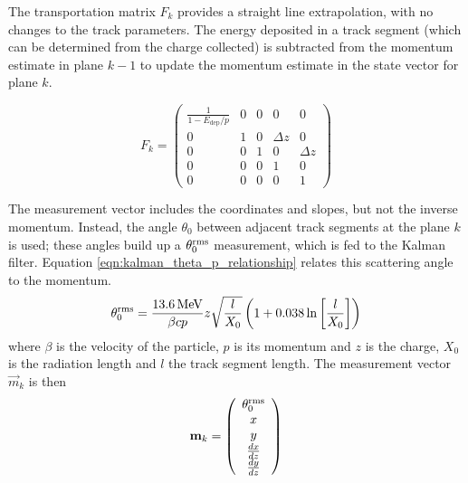 The transportation matrix $F_k$ provides a straight line extrapolation, with no changes to the track parameters. The energy deposited in a track segment (which can be determined from the charge collected) is subtracted from the momentum estimate in plane $k-1$ to update the momentum estimate in the state vector for plane $k$.

\begin{equation}\label{eqn:kalman_transportation_matrix}
    F_k = \left( \begin{array}{ccccc}
    \frac{1}{1-E_{\mathrm{dep}}/p}  &   0   &   0   &   0       &   0       \\
    0                               &   1   &   0   & \Delta z  &   0       \\
    0                               &   0   &   1   &   0       & \Delta z  \\
    0                               &   0   &   0   &   1       &   0       \\
    0                               &   0   &   0   &   0       &   1
    \end{array} \right)
\end{equation}

The measurement vector includes the coordinates and slopes, but not the inverse momentum. Instead, the angle $\theta_0$ between adjacent track segments at the plane $k$ is used; these angles build up a $\theta_0^{\mathrm{rms}}$ measurement, which is fed to the Kalman filter. Equation \eqref{eqn:kalman_theta_p_relationship} relates this scattering angle to the momentum\citep{Eidelman2004}.
\begin{equation}\label{eqn:kalman_theta_p_relationship}
    \theta_0^{\mathrm{rms}} = \frac{13.6\,\mathrm{MeV}}{\beta c p} z \sqrt{\frac{l}{X_0}} \left(1 + 0.038\ln\left[\frac{l}{X_0}\right]\right)
\end{equation}
where $\beta$ is the velocity of the particle, $p$ is its momentum and $z$ is the charge, $X_0$ is the radiation length and $l$ the track segment length. The measurement vector $\vec{m}_k$ is then
\begin{equation}\label{eqn:kalman_measurement_vector}
    \mathbf{m}_k = \left( \begin{array}{c} \theta_0^{\mathrm{rms}} \\ x \\ y \\ \frac{dx}{dz} \\ \frac{dy}{dz} \end{array} \right)
\end{equation}

